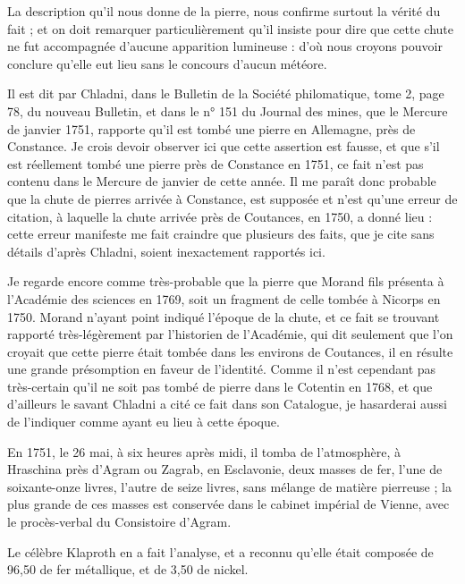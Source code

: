 \documentclass[a4paper, 12pt, oneside, french]{article}
\begin{document}
La description qu'il nous donne de la pierre, nous confirme surtout la vérité du fait ; et on doit remarquer particulièrement qu'il insiste pour dire que cette chute ne fut accompagnée d'aucune apparition lumineuse : d'où nous croyons pouvoir conclure qu'elle eut lieu sans le concours d'aucun météore.

Il est dit par Chladni, dans le Bulletin de la Société philomatique, tome 2, page 78, du nouveau Bulletin, et dans le n° 151 du Journal des mines, que le Mercure de janvier 1751, rapporte qu'il est tombé une pierre en Allemagne, près de Constance. Je crois devoir observer ici que cette assertion est fausse, et que s'il est réellement tombé une pierre près de Constance en 1751, ce fait n'est pas contenu dans le Mercure de janvier de cette année. Il me paraît donc probable que la chute de pierres arrivée à Constance, est supposée et n'est qu'une erreur de citation, à laquelle la chute arrivée près de Coutances, en 1750, a donné lieu : cette erreur manifeste me fait craindre que plusieurs des faits, que je cite sans détails d'après Chladni, soient inexactement rapportés ici.

Je regarde encore comme très-probable que la pierre que Morand fils présenta à l'Académie des sciences en 1769, soit un fragment de celle tombée à Nicorps en 1750. Morand n'ayant point indiqué l'époque de la chute, et ce fait se trouvant rapporté très-légèrement par l'historien de l'Académie, qui dit seulement que l'on croyait que cette pierre était tombée dans les environs de Coutances, il en résulte une grande présomption en faveur de l'identité. Comme il n'est cependant pas très-certain qu'il ne soit pas tombé de pierre dans le Cotentin en 1768, et que d'ailleurs le savant Chladni a cité ce fait dans son Catalogue, je hasarderai aussi de l'indiquer comme ayant eu lieu à cette époque.

En 1751, le 26 mai, à six heures après midi, il tomba de l'atmosphère, à Hraschina près d'Agram ou Zagrab, en Esclavonie, deux masses de fer, l'une de soixante-onze livres, l'autre de seize livres, sans mélange de matière pierreuse ; la plus grande de ces masses est conservée dans le cabinet impérial de Vienne, avec le procès-verbal du Consistoire d'Agram.

Le célèbre Klaproth en a fait l'analyse, et a reconnu qu'elle était composée de 96,50 de fer métallique, et de 3,50 de nickel.
\end{document}
